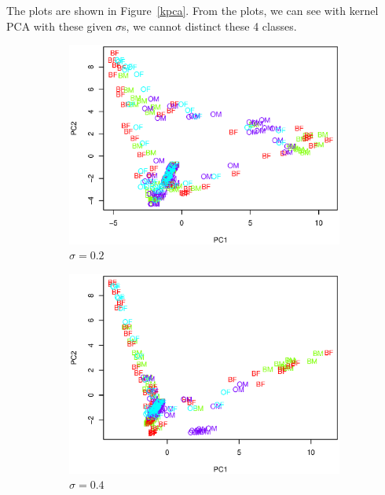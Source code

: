 \documentclass{article}
\begin{document}
\begin{enumerate}[leftmargin = 0 em, label = \arabic*., font = \bfseries]
\begin{enumerate}
The plots are shown in Figure~\ref{kpca}. From the plots, we can see with kernel PCA with these given $\sigma$s, we cannot distinct these 4 classes.
\begin{figure}[!htb]
    \centering
	\begin{subfigure}[b]{0.45\textwidth}
	\includegraphics[width = \textwidth]{sigma02.eps}
	\caption{$\sigma = 0.2$}
	\end{subfigure}%
	\begin{subfigure}[b]{0.45\textwidth}
	\includegraphics[width = \textwidth]{sigma04.eps}
	\caption{$\sigma = 0.4$}
	\end{subfigure}%
	\\
	\begin{subfigure}[b]{0.45\textwidth}

\end{subfigure}
\end{figure}
\end{enumerate}
\end{enumerate}
\end{document}
